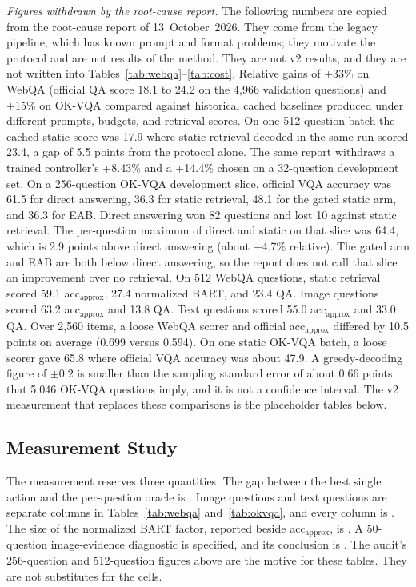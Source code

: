 \textit{Figures withdrawn by the root-cause report.}
The following numbers are copied from the root-cause report of 13~October~2026.
They come from the legacy pipeline, which has known prompt and format problems; they motivate the protocol and are not results of the method. They are not v2 results, and they are not written into Tables~\ref{tab:webqa}--\ref{tab:cost}.
Relative gains of +33\% on WebQA (official QA score 18.1 to 24.2 on the 4{,}966 validation questions) and +15\% on OK-VQA compared against historical cached baselines produced under different prompts, budgets, and retrieval scores. On one 512-question batch the cached static score was 17.9 where static retrieval decoded in the same run scored 23.4, a gap of 5.5 points from the protocol alone.
The same report withdraws a trained controller's +8.43\% and a +14.4\% chosen on a 32-question development set.
On a 256-question OK-VQA development slice, official VQA accuracy was 61.5 for direct answering, 36.3 for static retrieval, 48.1 for the gated static arm, and 36.3 for EAB.
Direct answering won 82 questions and lost 10 against static retrieval.
The per-question maximum of direct and static on that slice was 64.4, which is 2.9 points above direct answering (about +4.7\% relative).
The gated arm and EAB are both below direct answering, so the report does not call that slice an improvement over no retrieval.
On 512 WebQA questions, static retrieval scored 59.1 acc$_{\mathrm{approx}}$, 27.4 normalized BART, and 23.4 QA.
Image questions scored 63.2 acc$_{\mathrm{approx}}$ and 13.8 QA.
Text questions scored 55.0 acc$_{\mathrm{approx}}$ and 33.0 QA.
Over 2{,}560 items, a loose WebQA scorer and official acc$_{\mathrm{approx}}$ differed by 10.5 points on average (0.699 versus 0.594).
On one static OK-VQA batch, a loose scorer gave 65.8 where official VQA accuracy was about 47.9.
A greedy-decoding figure of $\pm 0.2$ is smaller than the sampling standard error of about 0.66 points that 5{,}046 OK-VQA questions imply, and it is not a confidence interval.
The v2 measurement that replaces these comparisons is the placeholder tables below.

\subsection{Measurement Study}
\label{sec:measure}
The measurement reserves three quantities.
The gap between the best single action and the per-question oracle is \ph{}.
Image questions and text questions are separate columns in Tables~\ref{tab:webqa} and~\ref{tab:okvqa}, and every column is \ph{}.
The size of the normalized BART factor, reported beside acc$_{\mathrm{approx}}$, is \ph{}.
A 50-question image-evidence diagnostic is specified, and its conclusion is \ph{}.
The audit's 256-question and 512-question figures above are the motive for these tables.
They are not substitutes for the cells.

